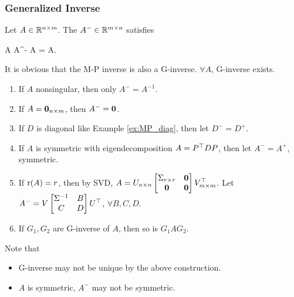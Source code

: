 \documentclass[10pt,a4paper]{book}
\begin{document}
\subsubsection{Generalized Inverse}\label{sec:gen_inv}
\begin{defbox}
	\begin{definition}\label{def:gen_inv}
		Let $A\in\mathbb R^{n\times m}$. The  $A^-\in\mathbb R^{m\times n}$ satisfies 
		\begin{sequation*}
			A A^- A = A.
		\end{sequation*}
	\end{definition}
\end{defbox}
It is obvious that the M-P inverse is also a G-inverse. 
$\forall A$, G-inverse exists.
\begin{enumerate}
	\item If $A$ nonsingular, then only $A^-=A^{-1}$.
	\item If $A={\boldsymbol 0}_{n\times m}$, then $A^{-}={\boldsymbol 0}$.
	\item If $D$ is diagonal like Example \ref{ex:MP_diag}, then let $D^{-}=D^{+}$.
	\item If $A$ is symmetric with eigendecomposition $A=P^\top D P$, then let $A^-=A^+$, symmetric.    
	\item If $\mathrm{r}(A)=r$, then by SVD, $A=U_{n\times n}\begin{bmatrix}
		\Sigma_{r\times r} & {\boldsymbol 0} \\ {\boldsymbol 0} & {\boldsymbol 0}
	\end{bmatrix}V_{m\times m}^\top$. Let $A^{-}=V\begin{bmatrix}
		\Sigma^{-1} & B \\ C & D
	\end{bmatrix}U^\top$, $\forall B,C,D$. 
	\item If $G_1,G_2$ are G-inverse of $A$, then so is $G_1AG_2$.   
\end{enumerate}  
Note that 
\begin{itemize}
	\item G-inverse may not be unique by the above construction. 
	\item $A$ is symmetric, $A^-$ may not be symmetric.
\end{itemize}
\end{document}
